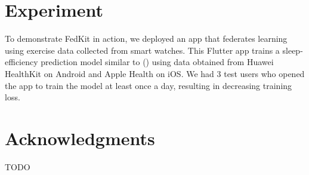 \documentclass[letterpaper]{article} %
\begin{document}
\section{Experiment}
To demonstrate FedKit in action,
we deployed an app that federates learning using exercise data collected from
smart watches.
This Flutter app trains a sleep-efficiency prediction model similar to ()
using data obtained from Huawei HealthKit
on Android and Apple Health on iOS.
We had 3 test users who opened the app to train the model at least once a day,
resulting in decreasing training loss.

\appendix

\section*{Acknowledgments}
TODO

\bigskip


\end{document}
